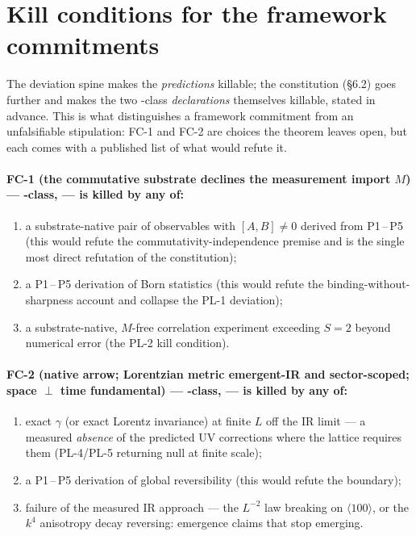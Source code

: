 \section{Kill conditions for the framework commitments}\label{sec:kill-conditions}

The deviation spine makes the \emph{predictions} killable; the constitution
(\S6.2) goes further and makes the two -class \emph{declarations}
themselves killable, stated in advance. This is what distinguishes a framework
commitment from an unfalsifiable stipulation: FC-1 and FC-2 are choices the
theorem leaves open, but each comes with a published list of what would refute
it.

\paragraph{FC-1 (the commutative substrate declines the measurement import $M$)
--- -class,  --- is killed by any of:}
\begin{enumerate}[leftmargin=1.6em,itemsep=2pt,topsep=2pt]
  \item a substrate-native pair of observables with $[A,B]\neq0$ derived from
  P1\,--\,P5 (this would refute the commutativity-independence premise
   and is the single most direct refutation of the constitution);
  \item a P1\,--\,P5 derivation of Born statistics (this would refute the
  binding-without-sharpness account and collapse the PL-1 deviation);
  \item a substrate-native, $M$-free correlation experiment exceeding $S=2$
  beyond numerical error (the PL-2 kill condition).
\end{enumerate}

\paragraph{FC-2 (native arrow; Lorentzian metric emergent-IR and sector-scoped;
space $\perp$ time fundamental) --- -class,  --- is killed by
any of:}
\begin{enumerate}[leftmargin=1.6em,itemsep=2pt,topsep=2pt]
  \item exact $\gamma$ (or exact Lorentz invariance) at finite $L$ off the IR
  limit --- a measured \emph{absence} of the predicted UV corrections where the
  lattice requires them (PL-4/PL-5 returning null at finite scale);
  \item a P1\,--\,P5 derivation of global reversibility (this would refute the
   boundary);
  \item failure of the measured IR approach --- the $L^{-2}$ law breaking on
  $\langle100\rangle$, or the $k^4$ anisotropy decay reversing: emergence claims
  that stop emerging.
\end{enumerate}

